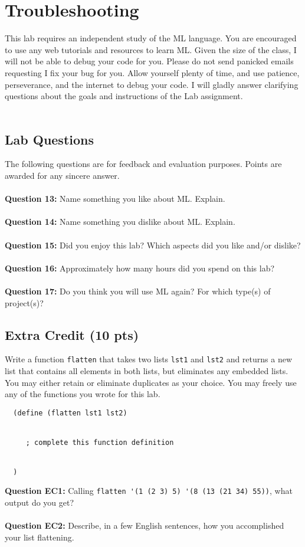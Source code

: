 \documentclass{article}
\begin{document}
\section*{Troubleshooting}
This lab requires an independent study of the ML language. You are encouraged to use any web tutorials and resources to learn ML. Given the size of the class, I will not be able to debug your code for you. Please do not send panicked emails requesting I fix your bug for you. Allow yourself plenty of time, and use patience, perseverance, and the internet to debug your code. I will gladly answer clarifying questions about the goals and instructions of the Lab assignment.
\\\\
\begin{tcolorbox}
 \section*{Lab Questions}
 The following questions are for feedback and evaluation purposes. Points are awarded for any sincere answer.
 \\\\
 \textbf{Question 13:} Name something you like about ML. Explain.
 \\\\
 \textbf{Question 14:} Name something you dislike about ML. Explain.
 \\\\
 \textbf{Question 15:} Did you enjoy this lab? Which aspects did you like and/or dislike?
 \\\\
 \textbf{Question 16:} Approximately how many hours did you spend on this lab?
 \\\\
 \textbf{Question 17:} Do you think you will use ML again? For which type(s) of project(s)?
\end{tcolorbox}
\vspace{1em}
\begin{tcolorbox}
 \section*{Extra Credit (10 pts)}
 Write a function \verb|flatten| that takes two lists \verb|lst1| and \verb|lst2| and returns a new list that contains all elements in both lists, but eliminates any embedded lists. You may either retain or eliminate duplicates as your choice. You may freely use any of the functions you wrote for this lab.
 \begin{lstlisting}
  (define (flatten lst1 lst2)
  
  
     ; complete this function definition
     
     
  )
 \end{lstlisting}
 \textbf{Question EC1:} Calling \verb|flatten '(1 (2 3) 5) '(8 (13 (21 34) 55))|, what output do you get?
 \\\\
 \textbf{Question EC2:} Describe, in a few English sentences, how you accomplished your list flattening.
\end{tcolorbox}
\end{document}
